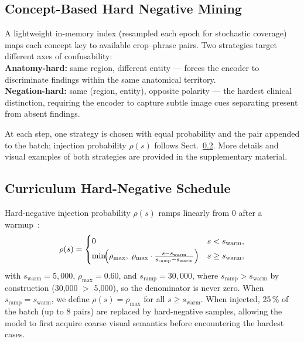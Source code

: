 \documentclass[runningheads]{llncs}
\begin{document}
\subsection{Concept-Based Hard Negative Mining}
\label{ssec:hardneg}

A lightweight in-memory index (resampled each epoch for stochastic
coverage) maps each concept key to available crop--phrase pairs.
Two strategies target different axes of confusability:\\[2pt]
\noindent\textbf{Anatomy-hard:} same region, different entity --- forces the
encoder to discriminate findings within the same anatomical territory.\\[2pt]
\noindent\textbf{Negation-hard:} same (region, entity), opposite polarity --- the
hardest clinical distinction, requiring the encoder to capture subtle
image cues separating present from absent findings.

At each step, one strategy is chosen with equal probability and the
pair appended to the batch; injection probability $\rho(s)$ follows
Sect.~\ref{ssec:curriculum}.
More details and visual examples of both strategies are provided in
the supplementary material.

\subsection{Curriculum Hard-Negative Schedule}
\label{ssec:curriculum}

Hard-negative injection probability $\rho(s)$ ramps linearly from 0
after a warmup~\cite{curriculumlearning}:
\begin{equation}
  \rho(s) =
  \begin{cases}
    0 & s < s_\text{warm}, \\[2pt]
    \min\!\Bigl(\rho_\text{max},\;
                \rho_\text{max}\cdot
                \tfrac{s - s_\text{warm}}{s_\text{ramp} - s_\text{warm}}
               \Bigr)
      & s \geq s_\text{warm},
  \end{cases}
  \label{eq:curriculum}
\end{equation}
with $s_\text{warm}{=}5{,}000$, $\rho_\text{max}{=}0.60$, and
$s_\text{ramp}{=}30{,}000$, where $s_\mathrm{ramp} > s_\mathrm{warm}$ by
construction (30,000 $>$ 5,000), so the denominator is never zero.
When $s_\text{ramp} = s_\text{warm}$, we define $\rho(s) = \rho_\text{max}$ for all $s \geq s_\text{warm}$.
When injected, 25\,\% of the batch (up to 8 pairs) are replaced by
hard-negative samples, allowing the model to first acquire coarse
visual semantics before encountering the hardest cases.
\end{document}
